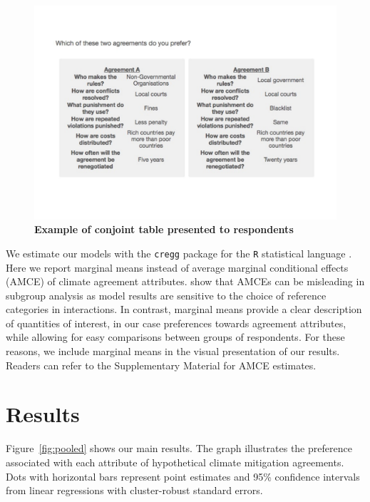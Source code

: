 \documentclass[a4paper,12pt]{article}
\begin{document}
\begin{figure}[H]
	\centering
	\includegraphics[width=13cm]{conjoint-cropped.pdf}
	\caption{\textbf{Example of conjoint table presented to respondents}}
	\label{fig:conjoint}
\end{figure}

We estimate our models with the \texttt{cregg} package \citep{leeper2018cregg} for the \texttt{R} statistical language \citep{rstats2019}. Here we report marginal means instead of average marginal conditional effects (AMCE) of climate agreement attributes. \citet{leeper2018subgroup} show that AMCEs can be misleading in subgroup analysis as model results are sensitive to the choice of reference categories in interactions. In contrast, marginal means provide a clear description of quantities of interest, in our case preferences towards agreement attributes, while allowing for easy comparisons between groups of respondents. For these reasons, we include marginal means in the visual presentation of our results. Readers can refer to the Supplementary Material for AMCE estimates.  

\section{Results}%
\label{sec:results}

Figure~\ref{fig:pooled} shows our main results. The graph illustrates the preference associated with each attribute of hypothetical climate mitigation agreements. Dots with horizontal bars represent point estimates and 95\% confidence intervals from linear regressions with cluster-robust standard errors. \\ 
\end{document}
